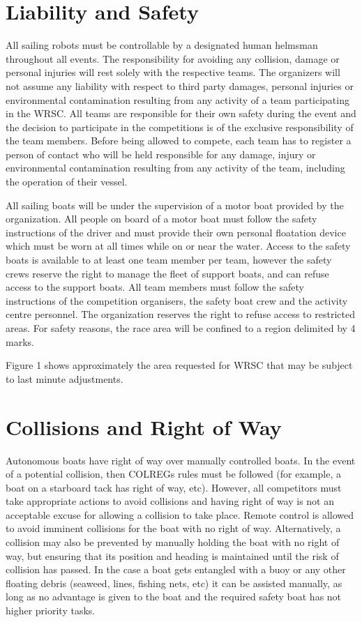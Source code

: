 \documentclass[12pt]{article}
\begin{document}
\section{Liability and Safety}
All sailing robots must be controllable by a designated human helmsman
throughout all events. The responsibility for avoiding any collision, 
damage or personal injuries will rest solely with the respective teams. 
The organizers will not assume any liability with respect to third party
damages, personal injuries or environmental contamination resulting from any
activity of a team participating in the WRSC. All teams are responsible for 
their own safety during the event and the decision to participate in the 
competitions is of the exclusive responsibility of the team members.
Before being allowed to compete, each team has to register a person of contact
who will be held responsible for any damage, injury or environmental
contamination resulting from any activity of the team, including the 
operation of their vessel.

All sailing boats will be under the supervision of a motor boat provided by the
organization.
All people on board of a motor boat must follow the safety instructions of the driver 
and must provide their own personal floatation device which must be worn at all times 
while on or near the water. Access to the safety boats is available to at least
one team member per team, however the safety crews reserve the
right to manage the fleet of support boats, and can refuse access to the support
boats.
All team members must follow the safety instructions of the competition
organisers, the safety boat crew and the activity centre personnel. The organization
reserves the right to refuse access to restricted areas.
For safety reasons, the race area will be confined to a region delimited by 4
marks. 

Figure 1
shows approximately the area requested for WRSC that may be subject to last
minute adjustments.


\section{Collisions and Right of Way}
Autonomous boats have right of way over manually controlled boats. In the event
of a potential
collision, then COLREGs rules must be followed (for example, a boat on a
starboard tack has
right of way, etc). However, all competitors must take appropriate actions to
avoid collisions
and having right of way is not an acceptable excuse for allowing a collision to
take place.
Remote control is allowed to avoid imminent collisions for the boat with no 
right of way. Alternatively, a collision may also be
prevented by manually holding the boat with no right of way, but ensuring that 
its position and heading is maintained until the risk of collision has passed. 
In the case a boat gets entangled with a buoy or any other
floating debris (seaweed, lines, fishing nets, etc) it can be assisted manually,
as long as no advantage is given to the boat and the required safety boat has
not higher priority tasks.
\end{document}
